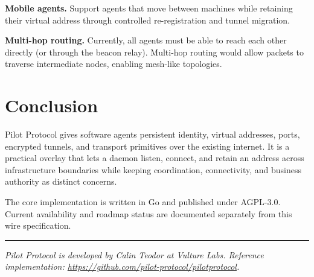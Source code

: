 \documentclass[11pt,a4paper]{article}
\begin{document}
\textbf{Mobile agents.} Support agents that move between machines while retaining their virtual address through controlled re-registration and tunnel migration.

\textbf{Multi-hop routing.} Currently, all agents must be able to reach each other directly (or through the beacon relay). Multi-hop routing would allow packets to traverse intermediate nodes, enabling mesh-like topologies.

\section{Conclusion}

Pilot Protocol gives software agents persistent identity, virtual addresses, ports, encrypted tunnels, and transport primitives over the existing internet. It is a practical overlay that lets a daemon listen, connect, and retain an address across infrastructure boundaries while keeping coordination, connectivity, and business authority as distinct concerns.

The core implementation is written in Go and published under AGPL-3.0. Current availability and roadmap status are documented separately from this wire specification.

\vspace{2em}
\noindent\rule{\textwidth}{0.4pt}

\smallskip
\noindent\textit{Pilot Protocol is developed by Calin Teodor at Vulture Labs. Reference implementation: \url{https://github.com/pilot-protocol/pilotprotocol}.}
\end{document}

